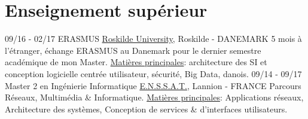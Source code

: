 \documentclass[]{friggeri-cv}
\begin{document}
\section{Enseignement supérieur}
\vspace{-0.5em}

\begin{entrylist}
 \entry
 {09/16 - 02/17}
 {ERASMUS}
 {\href{http://www.ruc.dk/en/}{Roskilde University}, Roskilde - DANEMARK}
 {5 mois à l'étranger, échange ERASMUS au Danemark pour le dernier semestre académique de mon Master. \underline{Matières principales}: architecture des SI et conception logicielle centrée utilisateur, sécurité, Big Data, danois.}
 \entry
 {09/14 - 09/17}
 {Master 2 en Ingénierie Informatique}
 {\href{http://www.enssat.fr}{E.N.S.S.A.T.}, Lannion - FRANCE}
 {Parcours Réseaux, Multimédia \& Informatique. \underline{Matières principales}: Applications réseaux, Architecture des systèmes, Conception de services \& d'interfaces utilisateurs. } %
 \vspace{-2.5em}

\end{entrylist}

\end{document}
